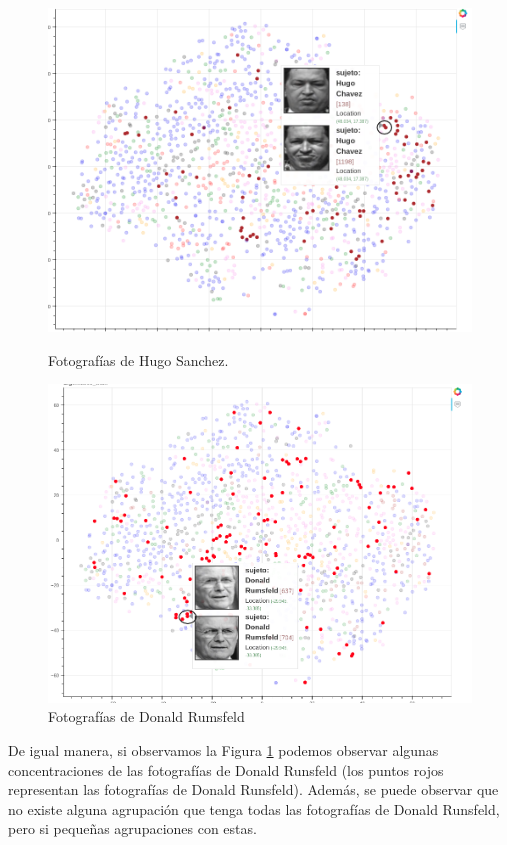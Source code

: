 \documentclass[paper=letter, fontsize=11pt]{scrartcl}
\numberwithin{equation}{section} %
\numberwithin{figure}{section} %
\numberwithin{table}{section} %
\begin{document}
\begin{figure}[H]
  \includegraphics[width=\linewidth]{figure/hugo.png}
  \caption{Fotografías de Hugo Sanchez.}
  \label{hugo}
\endminipage\hfill
{}
  \includegraphics[width=\linewidth]{figure/donald.png}
  \caption{Fotografías de Donald Rumsfeld}
  \label{donald}
\endminipage
\end{figure}

De igual manera, si observamos la Figura \ref{donald} podemos observar algunas concentraciones de las fotografías de Donald Runsfeld (los puntos rojos representan las fotografías de Donald Runsfeld). Además, se puede observar que no existe alguna agrupación que tenga todas las fotografías de Donald Runsfeld, pero si pequeñas agrupaciones con estas.\\
\end{document}

